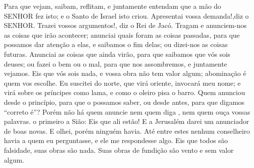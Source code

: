 {Para que vejam, saibam, reflitam, e juntamente entendam que a mão do SENHOR fez isto; e o Santo de Israel isto criou.
Apresentai vossa demanda!,diz o SENHOR. Trazei vossos argumentos!, diz o Rei de Jacó.
Tragam e anunciem-nos as coisas que irão acontecer; anunciai quais foram as coisas passadas, para que possamos dar atenção a elas, e saibamos o fim delas; ou dizei-nos as coisas futuras.
Anunciai as coisas que ainda virão, para que saibamos que vós sois deuses; ou fazei o bem ou o mal, para que nos assombremos, e juntamente vejamos.
Eis que vós sois nada, e vossa obra não tem valor algum; abominação é quem vos escolhe.
Eu suscitei
{} do norte, que virá oriente,
{} invocará meu nome; e virá sobre os príncipes como
{} lama, e como o oleiro pisa o barro.
Quem anunciou
{} desde o princípio, para que o possamos saber, ou desde antes, para que digamos “correto é”? Porém não há quem anuncie
{} nem quem diga
{} , nem quem ouça vossas palavras.
 o primeiro
{} a Sião: Eis que ali estão! E a Jerusalém darei um anunciador de boas novas.
E olhei, porém ninguém havia. Até entre estes nenhum conselheiro havia a quem eu perguntasse, e ele me respondesse algo.
Eis que todos são falsidade, suas obras são nada. Suas obras de fundição são vento e sem valor algum.

}
